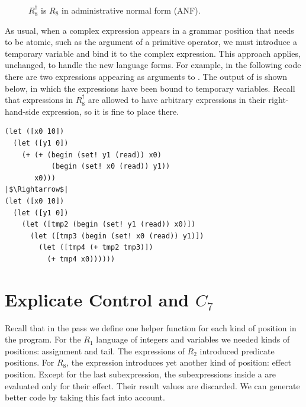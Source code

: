 \documentclass[11pt]{book}
\newcommand{\gray}[1]{{\color{gray} #1}}
\begin{document}
\begin{figure}[tp]
\centering
\fbox{
\begin{minipage}{0.96\textwidth}
\small
\[
\begin{array}{rcl}
\Atm &::=& \gray{ \INT{\Int} \mid \VAR{\Var} \mid \BOOL{\itm{bool}}
       \mid \VOID{} } \\
\Exp &::=& \ldots \mid \gray{ \LET{\Var}{\Exp}{\Exp} } \\
    &\mid& \WHILE{\Exp}{\Exp} \mid \SETBANG{\Var}{\Exp}
   \mid \BEGIN{\LP\Exp\ldots\RP}{\Exp} \\
\Def &::=& \gray{ \FUNDEF{\Var}{([\Var \code{:} \Type]\ldots)}{\Type}{\code{'()}}{\Exp} }\\
R^{\dagger}_8  &::=& \gray{ \PROGRAMDEFS{\code{'()}}{\Def} }
\end{array}
\]
\end{minipage}
}
\caption{$R_8^{\dagger}$ is $R_8$ in administrative normal form (ANF).}
\label{fig:r8-anf-syntax}
\end{figure}

As usual, when a complex expression appears in a grammar position that
needs to be atomic, such as the argument of a primitive operator, we
must introduce a temporary variable and bind it to the complex
expression.  This approach applies, unchanged, to handle the new
language forms.  For example, in the following code there are two
 expressions appearing as arguments to \code{+}.  The
output of  is shown below, in which the 
expressions have been bound to temporary variables. Recall that
 expressions in $R_8^{\dagger}$ are allowed to have
arbitrary expressions in their right-hand-side expression, so it is
fine to place  there.

\begin{lstlisting}
(let ([x0 10])
  (let ([y1 0])
    (+ (+ (begin (set! y1 (read)) x0)
           (begin (set! x0 (read)) y1))
       x0)))
|$\Rightarrow$|
(let ([x0 10])
  (let ([y1 0])
    (let ([tmp2 (begin (set! y1 (read)) x0)])
      (let ([tmp3 (begin (set! x0 (read)) y1)])
        (let ([tmp4 (+ tmp2 tmp3)])
          (+ tmp4 x0))))))
\end{lstlisting}

\section{Explicate Control and $C_7$}
\label{sec:explicate-loop}

Recall that in the  pass we define one helper
function for each kind of position in the program.  For the $R_1$
language of integers and variables we needed kinds of positions:
assignment and tail. The  expressions of $R_2$ introduced
predicate positions. For $R_8$, the  expression introduces
yet another kind of position: effect position. Except for the last
subexpression, the subexpressions inside a  are evaluated
only for their effect. Their result values are discarded. We can
generate better code by taking this fact into account.
\end{document}
